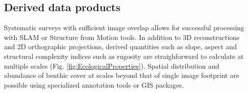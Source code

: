\subsection{Derived data products}
Systematic surveys with sufficient image overlap allows for successful processing with SLAM or Structure from Motion tools. In addition to 3D reconstructions and 2D orthographic projections, derived quantities such as slope, aspect and structural complexity indices such as rugosity are straighforward to calculate at multiple scales \cite{Friedman_2012} (Fig. \ref{fig:EcologicalProperties}). Spatial distribution and abundance of benthic cover at scales beyond that of single image footprint are possible using specialized annotation tools or GIS packages.
